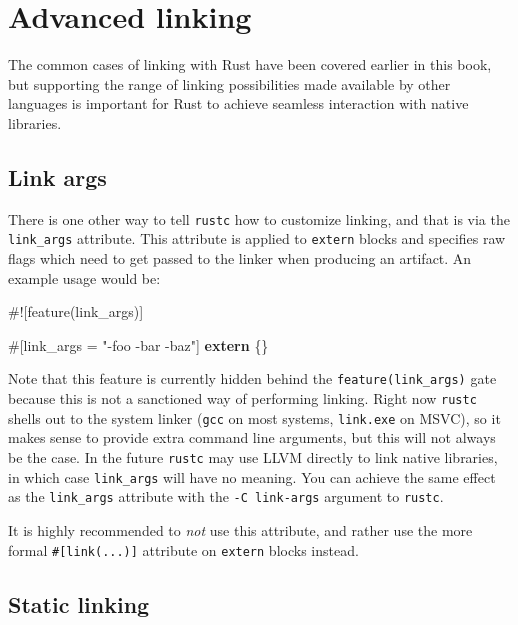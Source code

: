 \documentclass[a4paper,]{book}
\newenvironment{Shaded}{\begin{snugshade}}{\end{snugshade}}
\newcommand{\KeywordTok}[1]{\textcolor[rgb]{0.13,0.29,0.53}{\textbf{{#1}}}}
\newcommand{\StringTok}[1]{\textcolor[rgb]{0.31,0.60,0.02}{{#1}}}
\newcommand{\AttributeTok}[1]{\textcolor[rgb]{0.77,0.63,0.00}{{#1}}}
\newcommand{\NormalTok}[1]{{#1}}
\begin{document}
\section{Advanced linking}\label{sec--advanced-linking}

The common cases of linking with Rust have been covered earlier in this
book, but supporting the range of linking possibilities made available
by other languages is important for Rust to achieve seamless interaction
with native libraries.

\subsection{Link args}\label{link-args}

There is one other way to tell \texttt{rustc} how to customize linking,
and that is via the \texttt{link\_args} attribute. This attribute is
applied to \texttt{extern} blocks and specifies raw flags which need to
get passed to the linker when producing an artifact. An example usage
would be:

\begin{Shaded}
\begin{Highlighting}[]
\AttributeTok{#![}\NormalTok{feature}\AttributeTok{(}\NormalTok{link_args}\AttributeTok{)]}

\AttributeTok{#[}\NormalTok{link_args }\AttributeTok{=} \StringTok{"-foo -bar -baz"}\AttributeTok{]}
\KeywordTok{extern} \NormalTok{\{\}}
\end{Highlighting}
\end{Shaded}

Note that this feature is currently hidden behind the
\texttt{feature(link\_args)} gate because this is not a sanctioned way
of performing linking. Right now \texttt{rustc} shells out to the system
linker (\texttt{gcc} on most systems, \texttt{link.exe} on MSVC), so it
makes sense to provide extra command line arguments, but this will not
always be the case. In the future \texttt{rustc} may use LLVM directly
to link native libraries, in which case \texttt{link\_args} will have no
meaning. You can achieve the same effect as the \texttt{link\_args}
attribute with the \texttt{-C\ link-args} argument to \texttt{rustc}.

It is highly recommended to \emph{not} use this attribute, and rather
use the more formal \texttt{\#{[}link(...){]}} attribute on
\texttt{extern} blocks instead.

\subsection{Static linking}\label{static-linking}
\end{document}
